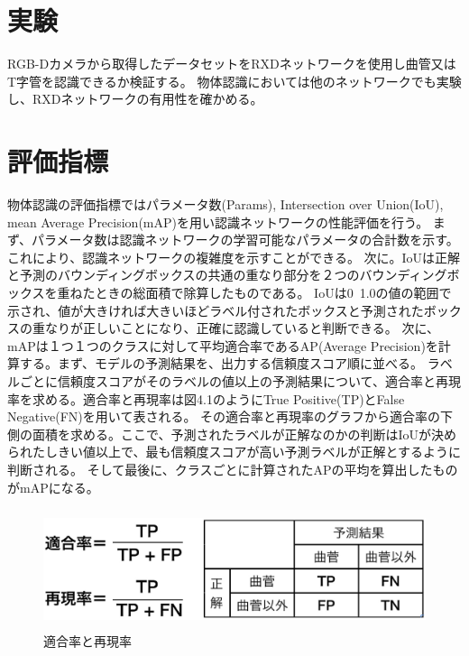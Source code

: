 ﻿\section{実験}

RGB-Dカメラから取得したデータセットをRXDネットワークを使用し曲管又はT字管を認識できるか検証する。
物体認識においては他のネットワークでも実験し、RXDネットワークの有用性を確かめる。

\section{評価指標}
物体認識の評価指標ではパラメータ数(Params), Intersection over Union(IoU), mean Average Precision(mAP)を用い認識ネットワークの性能評価を行う。
まず、パラメータ数は認識ネットワークの学習可能なパラメータの合計数を示す。これにより、認識ネットワークの複雑度を示すことができる。
次に。IoUは正解と予測のバウンディングボックスの共通の重なり部分を２つのバウンディングボックスを重ねたときの総面積で除算したものである。
IoUは0~1.0の値の範囲で示され、値が大きければ大きいほどラベル付されたボックスと予測されたボックスの重なりが正しいことになり、正確に認識していると判断できる。
次に、mAPは１つ１つのクラスに対して平均適合率であるAP(Average Precision)を計算する。まず、モデルの予測結果を、出力する信頼度スコア順に並べる。
ラベルごとに信頼度スコアがそのラベルの値以上の予測結果について、適合率と再現率を求める。適合率と再現率は図4.1のようにTrue Positive(TP)とFalse Negative(FN)を用いて表される。
その適合率と再現率のグラフから適合率の下側の面積を求める。ここで、予測されたラベルが正解なのかの判断はIoUが決められたしきい値以上で、最も信頼度スコアが高い予測ラベルが正解とするように判断される。
そして最後に、クラスごとに計算されたAPの平均を算出したものがmAPになる。

\begin{figure}[htbt]
	\centering
	 \includegraphics[height=35mm]{recall.eps}
	 \caption{適合率と再現率}
	 \label{fig:f2}
\end{figure}


